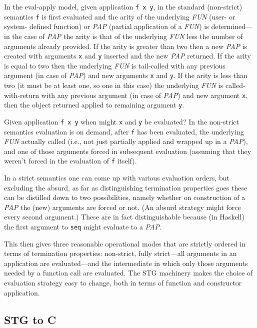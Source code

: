 \documentclass{llncs}
\begin{document}
In the eval-apply model, given application \texttt{f x y}, in the standard
(non-strict) semantics \texttt{f} is first evaluated and the arity of the
underlying \emph{FUN} (user- or system- defined function) or \emph{PAP}
(partial application of a \emph{FUN}) is determined---in the case of
\emph{PAP} the arity is that of the underlying \emph{FUN} less the number of
arguments already provided.  If the arity is greater than two then a new
\emph{PAP} is created with arguments \texttt{x} and \texttt{y} inserted and
the new \emph{PAP} returned.  If the arity is equal to two then the underlying
\emph{FUN} is tail-called with any previous argument (in case of \emph{PAP})
and new arguments \texttt{x} and \texttt{y}.  If the arity is less than two
(it must be at least one, so one in this case) the underlying \emph{FUN} is
called-with-return with any previous argument (in case of \emph{PAP}) and new
argument \texttt{x}, then the object returned applied to remaining argument
\texttt{y}.

Given application \texttt{f x y} when might \texttt{x} and \texttt{y} be
evaluated?  In the non-strict semantics evaluation is on demand, after
\texttt{f} has been evaluated, the underlying \emph{FUN} actually called
(i.e., not just partially applied and wrapped up in a \emph{PAP}), and one of
those arguments forced in subsequent evaluation (assuming that they weren't
forced in the evaluation of \texttt{f} itself).  

In a strict semantics one can come up with various evaluation orders, but
excluding the absurd, as far as distinguishing termination properties goes
these can be distilled down to two possibilities, namely whether on
construction of a \emph{PAP} the (new) arguments are forced or not.  (An
absurd strategy might force every second argument.)  These are in fact
distinguishable because (in Haskell) the first argument to \texttt{seq} might
evaluate to a \emph{PAP}.

This then gives three reasonable operational modes that are strictly ordered
in terms of termination properties: non-strict, fully strict---all arguments
in an application are evaluated---and the intermediate in which only those
arguments needed by a function call are evaluated.  The STG machinery makes
the choice of evaluation strategy easy to change, both in terms of function
and constructor application.

\subsection{STG to C}
\end{document}
